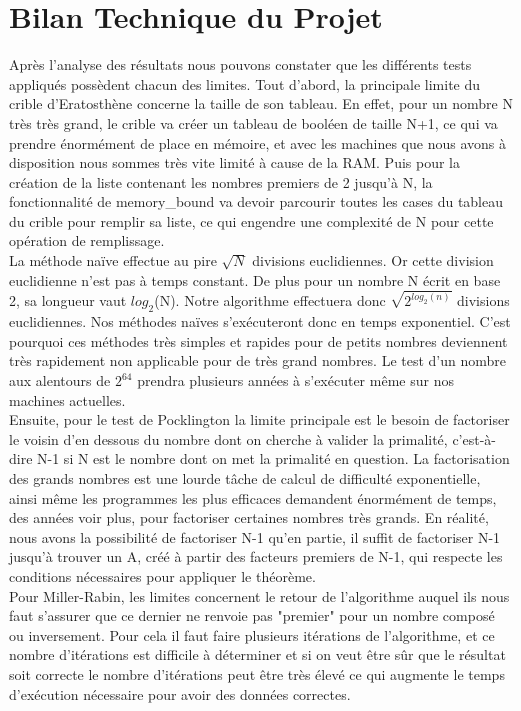 	\section{Bilan Technique du Projet}	
		Après l'analyse des résultats nous pouvons constater que les différents tests appliqués possèdent chacun des limites.	
		Tout d'abord, la principale limite du crible d'Eratosthène concerne la taille de son tableau. En effet, pour un nombre N très très grand, le crible va créer un tableau de booléen de taille N+1, ce qui va prendre énormément de place en mémoire, et avec les machines que nous avons à disposition nous sommes très vite limité à cause de la RAM. Puis pour la création de la liste contenant les nombres premiers de 2 jusqu'à N, la fonctionnalité de memory\_bound va devoir parcourir toutes les cases du tableau du crible pour remplir sa liste, ce qui engendre une complexité de N pour cette opération de remplissage.\\
		
		La méthode naïve effectue au pire $\sqrt{N}$ divisions euclidiennes. Or cette division euclidienne n'est pas à temps constant. De plus pour un nombre N écrit en base 2, sa longueur vaut $log_2$(N). Notre algorithme effectuera donc $\sqrt{2^{log_2(n)}}$ divisions euclidiennes. Nos méthodes naïves s’exécuteront donc en temps exponentiel. C'est pourquoi ces méthodes très simples et rapides pour de petits nombres deviennent très rapidement non applicable pour de très grand nombres. Le test d'un nombre aux alentours de $2^{64}$ prendra plusieurs années à s’exécuter même sur nos machines actuelles.\\
		
		Ensuite, pour le test de Pocklington la limite principale est le besoin de factoriser le voisin d’en dessous du nombre dont on cherche à valider la primalité, c’est-à-dire N-1 si N est le nombre dont on met la primalité en question. La factorisation des grands nombres est une lourde tâche de calcul de difficulté exponentielle, ainsi même les programmes les plus efficaces demandent énormément de temps, des années voir plus, pour factoriser certaines nombres très grands.
En réalité, nous avons la possibilité de factoriser N-1 qu’en partie, il suffit de factoriser N-1 jusqu’à trouver un A, créé à partir des facteurs premiers de N-1, qui respecte les conditions nécessaires pour appliquer le théorème.\\

		Pour Miller-Rabin, les limites concernent le retour de l'algorithme auquel ils nous faut s'assurer que ce dernier ne renvoie pas "premier" pour un nombre composé ou inversement. Pour cela il faut faire plusieurs itérations de l'algorithme, et ce nombre d'itérations est difficile à déterminer et si on veut être sûr que le résultat soit correcte le nombre d'itérations peut être très élevé ce qui augmente le temps d'exécution nécessaire pour avoir des données correctes.\\	
		
